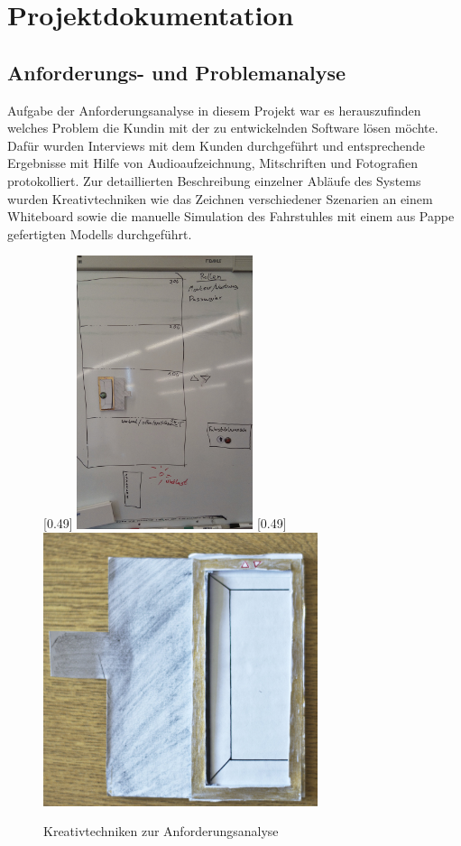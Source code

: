 \part{Projektdokumentation}

\chapter{Anforderungs- und Problemanalyse}
Aufgabe der Anforderungsanalyse in diesem Projekt war es herauszufinden welches Problem die Kundin mit der zu entwickelnden Software lösen möchte. Dafür wurden Interviews mit dem Kunden durchgeführt und entsprechende Ergebnisse mit Hilfe von Audioaufzeichnung, Mitschriften und Fotografien protokolliert. Zur detaillierten Beschreibung einzelner Abläufe des Systems wurden Kreativtechniken wie das Zeichnen verschiedener Szenarien an einem Whiteboard sowie die manuelle Simulation des Fahrstuhles mit einem aus Pappe gefertigten Modells durchgeführt.
\begin{figure}[hbt]
\centering
{}[0.49\linewidth]
{\includegraphics[height=8cm]{images/kundengespraech1.jpg}}
[0.49\linewidth]
{\includegraphics[height=8cm]{images/pappfahrstuhl.jpg}}
\caption{Kreativtechniken zur Anforderungsanalyse}
\end{figure}
